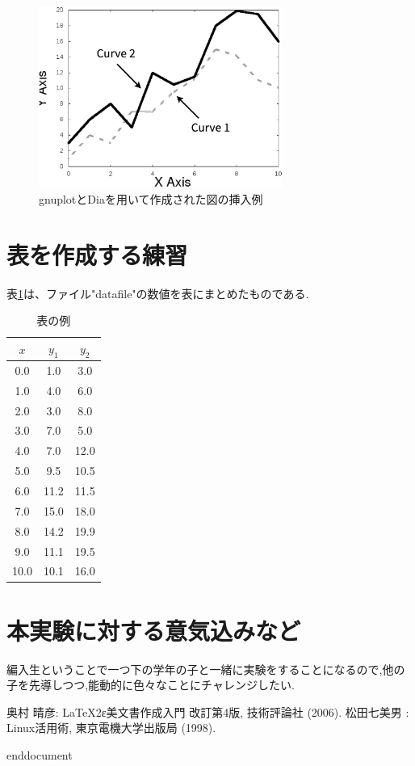 \documentclass{jarticle}
\begin{document}
\begin{figure}
\begin{center}
\includegraphics[width=8.0cm]{graph-e.eps}
\caption{gnuplotとDiaを用いて作成された図の挿入例}
\label{fig:graph}
\end{center}
\end{figure}

\section{表を作成する練習}
表\ref{table:datafile}は、ファイル"datafile"の数値を表にまとめたものである.


\begin{table}
\caption{表の例}
\label{table:datafile}
\begin{center}
\begin{tabular}{|c|c|c|}\hline
$x$ & $y_{1}$ & $y_{2}$ \\ \hline
0.0 & 1.0 & 3.0 \\ \hline
1.0 & 4.0 & 6.0 \\ \hline
2.0 & 3.0 & 8.0 \\ \hline
3.0 & 7.0 & 5.0 \\\hline
4.0 & 7.0 & 12.0 \\\hline
5.0 & 9.5 & 10.5 \\\hline
6.0 & 11.2 & 11.5 \\\hline
7.0 & 15.0 & 18.0 \\\hline
8.0 & 14.2 & 19.9 \\\hline
9.0 & 11.1 & 19.5 \\\hline
10.0 & 10.1 & 16.0 \\\hline
\end{tabular}
\end{center}
\end{table}
\section{本実験に対する意気込みなど}
編入生ということで一つ下の学年の子と一緒に実験をすることになるので,他の子を先導しつつ,能動的に色々なことにチャレンジしたい.
\

\begin{thebibliography}{99}
%
 奥村 晴彦: LaTeX2ε美文書作成入門 改訂第4版,  技術評論社 (2006).
%
 松田七美男 : Linux活用術, 東京電機大学出版局 (1998).
%
\end{thebibliography}
end{document}
\end{document}
